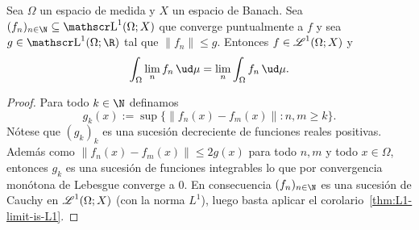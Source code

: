 \begin{thmi}
	Sea $\Omega$ un espacio de medida y $X$ un espacio de Banach.
	Sea $(f_n)_{n\in\N} \subseteq \LL^1(\Omega; X)$ que converge puntualmente a $f$ y sea $g \in \LL^1(\Omega; \R)$ tal que $\|f_n\| \le g$.
	Entonces $f \in \operatorname{\mathscr{L}}^1(\Omega; X)$ y
	$$ \int_\Omega \lim_n f_n\,\ud\mu = \lim_n \int_\Omega f_n\,\ud\mu. $$
\end{thmi}
\begin{proof}
	Para todo $k\in\N$ definamos
	$$ g_k(x) := \sup\{ \|f_n(x) - f_m(x)\| : n, m \ge k \}. $$
	Nótese que $(g_k)_k$ es una sucesión decreciente de funciones reales positivas.
	Además como $\|f_n(x) - f_m(x)\| \le 2g(x)$ para todo $n, m$ y todo $x \in \Omega$, entonces $g_k$ es una sucesión de funciones integrables
	lo que por convergencia monótona de Lebesgue converge a $0$.
	En consecuencia $(f_n)_{n\in\N}$ es una sucesión de Cauchy en $\operatorname{\mathscr{L}}^1(\Omega; X)$ (con la norma $L^1$),
	luego basta aplicar el corolario~\ref{thm:L1-limit-is-L1}.
\end{proof}

